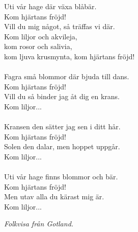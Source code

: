 \vspace{10pt}
Uti vår hage där växa blåbär.\\
Kom hjärtans fröjd!\\
Vill du mig något, så träffas vi där.\\
Kom liljor och akvileja,\\
kom rosor och salivia,\\
kom ljuva krusmynta, kom hjärtans fröjd!\\
\\
Fagra små blommor där bjuda till dans.\\
Kom hjärtans fröjd!\\
Vill du så binder jag åt dig en krans.\\
Kom liljor...\\
\\
Kransen den sätter jag sen i ditt hår.\\
Kom hjärtans fröjd!\\
Solen den dalar, men hoppet uppgår.\\
Kom liljor...\\
\\
Uti vår hage finns blommor och bär.\\
Kom hjärtans fröjd!\\
Men utav alla du kärast mig är.\\
Kom liljor...
\par
\vspace{10pt}
{\footnotesize\textit{Folkvisa från Gotland.}}
